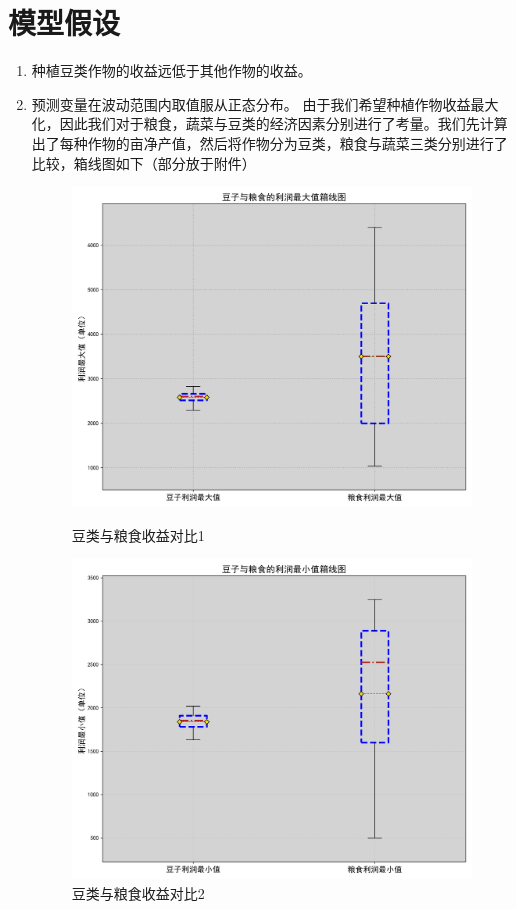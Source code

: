 \documentclass[12pt]{ctexart}
\begin{document}
\section{模型假设}  
\label{sec:assumptions}  
\begin{enumerate}[(1)]  
	\item 种植豆类作物的收益远低于其他作物的收益。
	\item 预测变量在波动范围内取值服从正态分布。
	\newline
	由于我们希望种植作物收益最大化，因此我们对于粮食，蔬菜与豆类的经济因素分别进行了考量。我们先计算出了每种作物的亩净产值，然后将作物分为豆类，粮食与蔬菜三类分别进行了比较，箱线图如下（部分放于附件）
	\begin{figure}[h]
		\centering
		\begin{minipage}{0.48\textwidth}
			\centering
			\includegraphics[width=\linewidth]{image7.png}
			\caption{豆类与粮食收益对比1}
			\label{fig:yield_comparison1}
		\end{minipage}\hfill
		\begin{minipage}{0.48\textwidth}
			\centering
			\includegraphics[width=\linewidth]{image8.png}
			\caption{豆类与粮食收益对比2}
			\label{fig:yield_comparison2}
		\end{minipage}
	\end{figure}
	

\end{enumerate}
\end{document}
